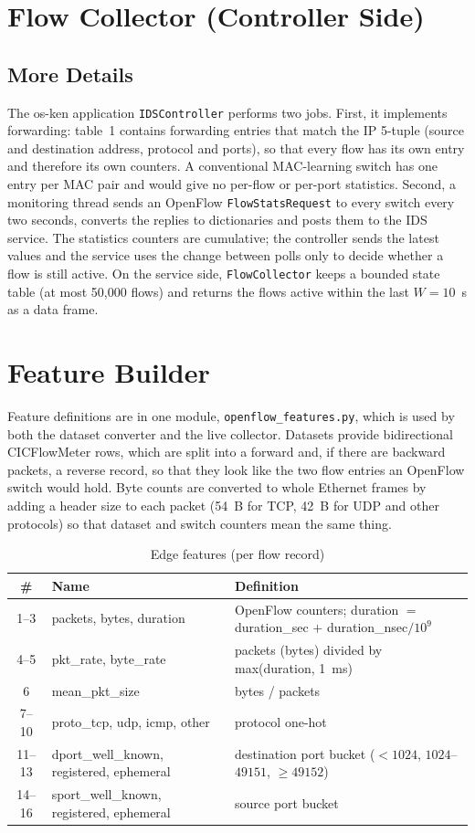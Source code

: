\section{Flow Collector (Controller Side)}
\subsection{More Details}
The os-ken application \texttt{IDSController} performs two jobs. First, it implements forwarding: table~1 contains forwarding entries that match the IP 5-tuple (source and destination address, protocol and ports), so that every flow has its own entry and therefore its own counters. A conventional MAC-learning switch has one entry per MAC pair and would give no per-flow or per-port statistics. Second, a monitoring thread sends an OpenFlow \texttt{FlowStatsRequest} to every switch every two seconds, converts the replies to dictionaries and posts them to the IDS service. The statistics counters are cumulative; the controller sends the latest values and the service uses the change between polls only to decide whether a flow is still active. On the service side, \texttt{FlowCollector} keeps a bounded state table (at most 50,000 flows) and returns the flows active within the last $W=10$~s as a data frame.

\section{Feature Builder}
Feature definitions are in one module, \texttt{openflow\_features.py}, which is used by both the dataset converter and the live collector. Datasets provide bidirectional CICFlowMeter rows, which are split into a forward and, if there are backward packets, a reverse record, so that they look like the two flow entries an OpenFlow switch would hold. Byte counts are converted to whole Ethernet frames by adding a header size to each packet (54~B for TCP, 42~B for UDP and other protocols) so that dataset and switch counters mean the same thing.

\begin{table}[htbp]
\centering
\caption{Edge features (per flow record)}
\label{tab:edgefeat}
\small
\begin{tabularx}{\textwidth}{|c|l|X|}
\hline
\textbf{\#} & \textbf{Name} & \textbf{Definition} \\ \hline
1--3 & packets, bytes, duration & OpenFlow counters; duration $=$ duration\_sec $+$ duration\_nsec$/10^9$ \\ \hline
4--5 & pkt\_rate, byte\_rate & packets (bytes) divided by max(duration, 1~ms) \\ \hline
6 & mean\_pkt\_size & bytes / packets \\ \hline
7--10 & proto\_tcp, udp, icmp, other & protocol one-hot \\ \hline
11--13 & dport\_well\_known, registered, ephemeral & destination port bucket ($<1024$, $1024$--$49151$, $\ge 49152$) \\ \hline
14--16 & sport\_well\_known, registered, ephemeral & source port bucket \\ \hline
\end{tabularx}
\end{table}

